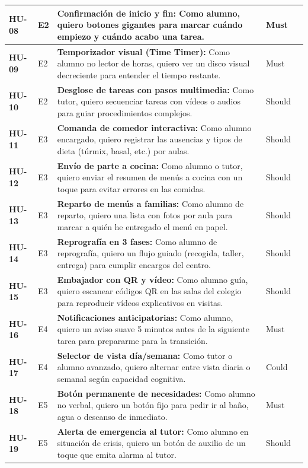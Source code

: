 \documentclass[11pt,a4paper]{article}
\begin{document}
{\begin{longtable}{|>{\centering\bfseries\arraybackslash}p{1.3cm}|>{\centering\arraybackslash}p{1.1cm}|>{\raggedright\arraybackslash}p{7.4cm}|>{\centering\arraybackslash}p{1.6cm}|>{\centering\arraybackslash}p{0.8cm}|}
HU-08 & E2 & \textbf{Confirmación de inicio y fin:} Como alumno, quiero botones gigantes para marcar cuándo empiezo y cuándo acabo una tarea. & Must & 2 \\ \hline
HU-09 & E2 & \textbf{Temporizador visual (Time Timer):} Como alumno no lector de horas, quiero ver un disco visual decreciente para entender el tiempo restante. & Must & 3 \\ \hline
HU-10 & E2 & \textbf{Desglose de tareas con pasos multimedia:} Como tutor, quiero secuenciar tareas con vídeos o audios para guiar procedimientos complejos. & Should & 5 \\ \hline
HU-11 & E3 & \textbf{Comanda de comedor interactiva:} Como alumno encargado, quiero registrar las ausencias y tipos de dieta (túrmix, basal, etc.) por aulas. & Should & 5 \\ \hline
HU-12 & E3 & \textbf{Envío de parte a cocina:} Como alumno o tutor, quiero enviar el resumen de menús a cocina con un toque para evitar errores en las comidas. & Should & 3 \\ \hline
HU-13 & E3 & \textbf{Reparto de menús a familias:} Como alumno de reparto, quiero una lista con fotos por aula para marcar a quién he entregado el menú en papel. & Should & 3 \\ \hline
HU-14 & E3 & \textbf{Reprografía en 3 fases:} Como alumno de reprografía, quiero un flujo guiado (recogida, taller, entrega) para cumplir encargos del centro. & Should & 5 \\ \hline
HU-15 & E3 & \textbf{Embajador con QR y vídeo:} Como alumno guía, quiero escanear códigos QR en las salas del colegio para reproducir vídeos explicativos en visitas. & Should & 5 \\ \hline
HU-16 & E4 & \textbf{Notificaciones anticipatorias:} Como alumno, quiero un aviso suave 5 minutos antes de la siguiente tarea para prepararme para la transición. & Must & 2 \\ \hline
HU-17 & E4 & \textbf{Selector de vista día/semana:} Como tutor o alumno avanzado, quiero alternar entre vista diaria o semanal según capacidad cognitiva. & Could & 2 \\ \hline
HU-18 & E5 & \textbf{Botón permanente de necesidades:} Como alumno no verbal, quiero un botón fijo para pedir ir al baño, agua o descanso de inmediato. & Must & 3 \\ \hline
HU-19 & E5 & \textbf{Alerta de emergencia al tutor:} Como alumno en situación de crisis, quiero un botón de auxilio de un toque que emita alarma al tutor. & Should & 3 \\ \hline

\end{longtable}}
\end{document}
